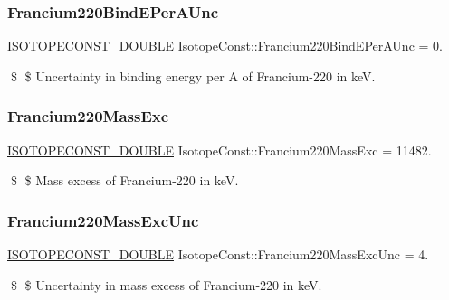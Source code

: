 \subsubsection{\texorpdfstring{Francium220\+Bind\+E\+Per\+A\+Unc}{Francium220BindEPerAUnc}}
{\footnotesize\ttfamily \mbox{\hyperlink{group___isotope_const-_macros_ga8f45a7272ce02c0b4c65c44636ed719a}{I\+S\+O\+T\+O\+P\+E\+C\+O\+N\+S\+T\+\_\+\+D\+O\+U\+B\+LE}} Isotope\+Const\+::\+Francium220\+Bind\+E\+Per\+A\+Unc = 0.}

\$ \$ Uncertainty in binding energy per A of Francium-\/220 in keV. \mbox{\label{group___isotope_const-_francium-_fr220_ga2d7234d336b1558b9ad2faf63e18cddc}} 
\subsubsection{\texorpdfstring{Francium220\+Mass\+Exc}{Francium220MassExc}}
{\footnotesize\ttfamily \mbox{\hyperlink{group___isotope_const-_macros_ga8f45a7272ce02c0b4c65c44636ed719a}{I\+S\+O\+T\+O\+P\+E\+C\+O\+N\+S\+T\+\_\+\+D\+O\+U\+B\+LE}} Isotope\+Const\+::\+Francium220\+Mass\+Exc = 11482.}

\$ \$ Mass excess of Francium-\/220 in keV. \mbox{\label{group___isotope_const-_francium-_fr220_gae5644ec48f0e4f49c6fe3e6dd32caf9e}} 
\subsubsection{\texorpdfstring{Francium220\+Mass\+Exc\+Unc}{Francium220MassExcUnc}}
{\footnotesize\ttfamily \mbox{\hyperlink{group___isotope_const-_macros_ga8f45a7272ce02c0b4c65c44636ed719a}{I\+S\+O\+T\+O\+P\+E\+C\+O\+N\+S\+T\+\_\+\+D\+O\+U\+B\+LE}} Isotope\+Const\+::\+Francium220\+Mass\+Exc\+Unc = 4.}

\$ \$ Uncertainty in mass excess of Francium-\/220 in keV. \mbox{\label{group___isotope_const-_francium-_fr220_ga204748e7deacbbf6121577a3bfd1f0b7}} 
